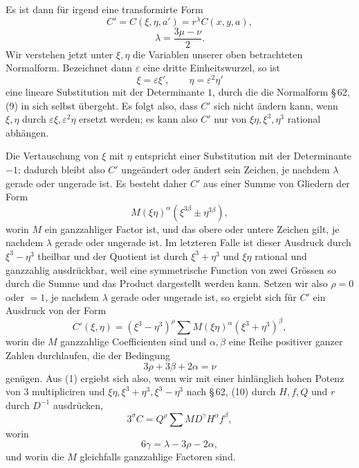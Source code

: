 \documentclass[11pt]{article}
\begin{document}
Es ist dann für irgend eine transformirte Form
\begin{equation}
 C'=C(\xi,\eta,a')=r^\lambda C(x,y,a),
\tag{1}
\end{equation}
\begin{equation}
 \lambda=\frac{3\mu-\nu}{2}.
\tag{2}
\end{equation}
Wir verstehen jetzt unter $\xi,\eta$ die Variablen unserer oben betrachteten Normalform. Bezeichnet dann $\varepsilon$ eine dritte Einheitswurzel, so ist
\[
 \xi=\varepsilon\xi',\qquad \eta=\varepsilon^2\eta'
\]
eine lineare Substitution mit der Determinante $1$, durch die die Normalform \S\,62, (9) in sich selbst übergeht. Es folgt also, dass $C'$ sich nicht ändern kann, wenn $\xi,\eta$ durch $\varepsilon\xi,\varepsilon^2\eta$ ersetzt werden; es kann also $C'$ nur von $\xi\eta,\xi^3,
\eta^3$ rational abhängen.

Die Vertauschung von $\xi$ mit $\eta$ entspricht einer Substitution mit der Determinante $-1$; dadurch bleibt also $C'$ ungeändert oder ändert sein Zeichen, je nachdem $\lambda$ gerade oder ungerade ist. Es besteht daher $C'$ aus einer Summe von Gliedern der Form
\[
 M(\xi\eta)^\alpha(\xi^{3\beta}\pm\eta^{3\beta}),
\]
worin $M$ ein ganzzahliger Factor ist, und das obere oder untere Zeichen gilt, je nachdem $\lambda$ gerade oder ungerade ist. Im letzteren Falle ist dieser Ausdruck durch $\xi^3-\eta^3$ theilbar und der Quotient ist durch $\xi^3+\eta^3$ und $\xi\eta$ rational und ganzzahlig ausdrückbar, weil eine symmetrische Function von zwei Grössen so durch die Summe und das Product dargestellt werden kann. Setzen wir also $\rho=0$ oder $=1$, je nachdem $\lambda$ gerade oder ungerade ist, so ergiebt sich für $C'$ ein Ausdruck von der Form
\[
 C'(\xi,\eta)=(\xi^3-\eta^3)^\rho\sum M(\xi\eta)^\alpha(\xi^3+\eta^3)^\beta,
\]
worin die $M$ ganzzahlige Coefficienten sind und $\alpha,\beta$ eine Reihe positiver ganzer Zahlen durchlaufen, die der Bedingung
\begin{equation}
 3\rho+3\beta+2\alpha=\nu
\tag{3}
\end{equation}
genügen. Aus (1) ergiebt sich also, wenn wir mit einer hinlänglich hohen Potenz von $3$ multipliciren und $\xi\eta,\xi^3+\eta^3,\xi^3-\eta^3$ nach \S\,62, (10) durch $H,f,Q$ und $r$ durch $D^{-1}$ ausdrücken,
\begin{equation}
 3^\sigma C=Q^\rho\sum MD^\gamma H^\alpha f^\beta,
\tag{4}
\end{equation}
worin
\begin{equation}
 6\gamma=\lambda-3\rho-2\alpha,
\tag{5}
\end{equation}
und worin die $M$ gleichfalls ganzzahlige Factoren sind.
\end{document}
